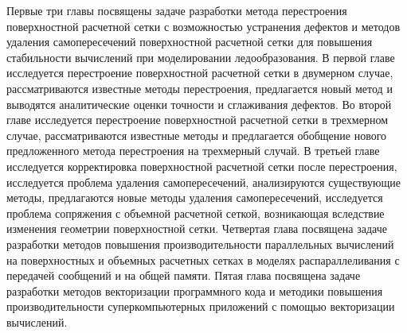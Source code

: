 Первые три главы посвящены задаче разработки метода перестроения поверхностной расчетной сетки с возможностью устранения дефектов и методов удаления самопересечений поверхностной расчетной сетки для повышения стабильности вычислений при моделировании ледообразования.
В первой главе исследуется перестроение поверхностной расчетной сетки в двумерном случае, рассматриваются известные методы перестроения, предлагается новый метод и выводятся аналитические оценки точности и сглаживания дефектов.
Во второй главе исследуется перестроение поверхностной расчетной сетки в трехмерном случае, рассматриваются известные методы и предлагается обобщение нового предложенного метода перестроения на трехмерный случай.
В третьей главе исследуется корректировка поверхностной расчетной сетки после перестроения, исследуется проблема удаления самопересечений, анализируются существующие методы, предлагаются новые методы удаления самопересечений, исследуется проблема сопряжения с объемной расчетной сеткой, возникающая вследствие изменения геометрии поверхностной сетки.
Четвертая глава посвящена задаче разработки методов повышения производительности параллельных вычислений на поверхностных и объемных расчетных сетках в моделях распараллеливания с передачей сообщений и на общей памяти.
Пятая глава посвящена задаче разработки методов векторизации программного кода и методики повышения производительности суперкомпьютерных приложений с помощью векторизации вычислений.